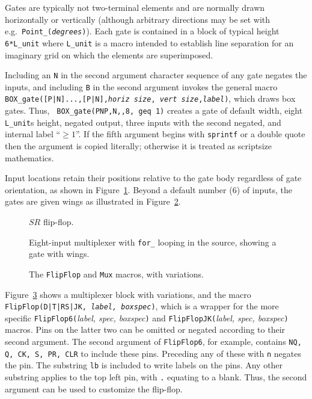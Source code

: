 Gates are typically not two-terminal elements and are normally drawn
horizontally or vertically (although arbitrary directions may be set
with e.g.\ {\tt Point\_({\sl degrees})}).
Each gate is contained in a
block of typical height {\tt 6*L\_unit} where {\tt L\_unit} is a macro
intended to establish line separation for an imaginary grid on which
the elements are superimposed.

Including an \verb|N| in the second
argument character sequence of any gate negates the inputs, and including
\verb|B| in the second argument invokes the
general macro {\tt BOX\_gate([P|N]...,[P|N],{\sl horiz size},{\sl
vert size},{\sl label})}, which draws box gates.  Thus, {\tt
BOX\_gate(PNP,N,,8, geq 1)} creates a gate of default width,
eight {\tt L\_unit}s height, negated output, three inputs with the
second negated, and internal label ``$\geq1$''.
If the fifth argument begins with {\tt sprintf} or a double quote then
the argument is copied literally; otherwise it is treated as scriptsize
mathematics.

Input locations retain their positions relative to the gate body
regardless of gate orientation, as shown in Figure~\ref{FF}.
Beyond a default number (6) of inputs, the
gates are given wings as illustrated in Figure~\ref{exVIII}.
\begin{figure}[h!t]
   \vspace*{-\baselineskip}
   \parbox{4.75in}{\small }%
   \quad
   \vspace*{-\baselineskip}
   \caption{$SR$ flip-flop.}
   \label{FF}
   \end{figure}
\begin{figure}[h!t]
   
   \vspace*{-\baselineskip}
   \caption{Eight-input multiplexer with
    {\tt for\_} looping in the source, showing a gate with wings.}
   \label{exVIII}
   \end{figure}
\begin{figure}[h!t]
   
   \caption{The {\tt FlipFlop} and {\tt Mux} macros, with variations.}
   \label{FlipFlops}
   \end{figure}

Figure~\ref{FlipFlops} shows a multiplexer block with variations, and
the macro {\tt FlipFlop(D|T|RS|JK, {\sl label, boxspec})}, which is a
wrapper for the more specific {\tt FlipFlop6(}{\sl label, spec,
boxspec}{\tt )} and {\tt FlipFlopJK(}{\sl label, spec, boxspec}{\tt )}
macros.  Pins on the latter two can be omitted or negated according to
their second argument.  The second argument of {\tt FlipFlop6}, for
example, contains {\tt NQ, Q, CK, S, PR, CLR} to include these pins.
Preceding any of these with {\tt n} negates the pin.  The substring
{\tt lb} is included to write labels on the pins.  Any other substring
applies to the top left pin, with {\tt .} equating to a blank.  Thus,
the second argument can be used to customize the flip-flop.

